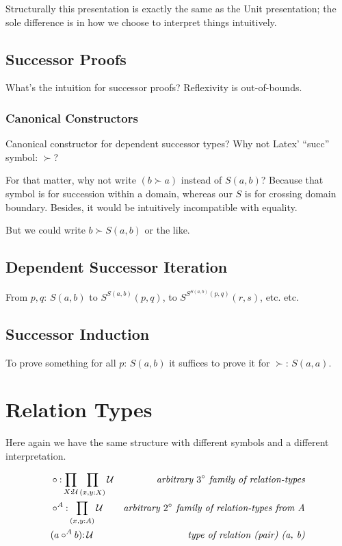 \documentclass{article}
\begin{document}
Structurally this presentation is exactly the same as the Unit
presentation; the sole difference is in how we choose to interpret
things intuitively.

\subsection{Successor Proofs}

What's the intuition for successor proofs?  Reflexivity is out-of-bounds.

\subsubsection{Canonical Constructors}
Canonical constructor for dependent successor types?  Why not Latex'
``succ'' symbol: \(\succ\)?

For that matter, why not write \((b\succ a)\) instead of \(S(a,b)\)?
Because that symbol is for succession within a domain, whereas our
\(S\) is for crossing domain boundary.  Besides, it would be
intuitively incompatible with equality.

But we could write \(b\succ S(a,b)\) or the like.

\subsection{Dependent Successor Iteration}

From \(p,q{:}\,S(a,b)\) to \(S^{S(a,b)}(p,q)\), to \(S^{S^{S(a,b)}(p,q)}(r,s)\), etc.
etc.

\subsection{Successor Induction}

To prove something for all \(p{:}\,S(a,b)\) it suffices to prove it for \(\succ{:}\,S(a,a)\).

\section{Relation Types}

\begin{remark}
  Here again we have the same structure with different symbols and a different interpretation.
\end{remark}

\begin{align}
  & \circ{:}\prod\limits_{X:\mathcal{U}}\prod\limits_{(x,y:X)}\mathcal{U} & \textit{arbitrary \(3^{\circ}\) family of relation-types} \\
  & \circ^A{:}\prod\limits_{(x,y:A)}\mathcal{U} & \textit{arbitrary \(2^{\circ}\) family of relation-types from A}\\
  & (a\circ^A b){:}\,\mathcal{U} & \textit{type of relation (pair) (a, b)} \\
\end{align}
\end{document}
